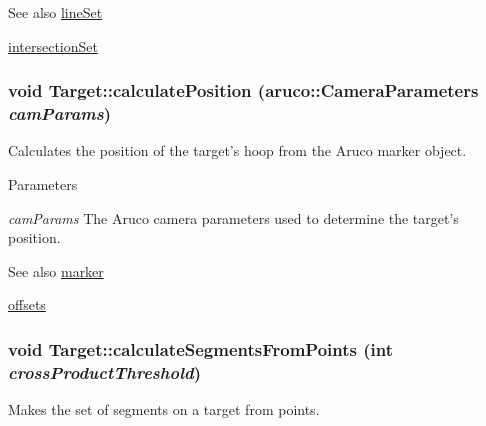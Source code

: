 \begin{DoxySeeAlso}{See also}
\hyperlink{classTarget_af112a6c4b4cb598d27f33332de574680}{lineSet} 

\hyperlink{classTarget_a26d36f01443f1f26da59e18ad4552a4f}{intersectionSet} 
\end{DoxySeeAlso}
\hypertarget{classTarget_aaeb297087804d9d7952b0588d76ac213}{
\subsubsection[{calculatePosition}]{\setlength{\rightskip}{0pt plus 5cm}void Target::calculatePosition (aruco::CameraParameters {\em camParams})}}
\label{classTarget_aaeb297087804d9d7952b0588d76ac213}


Calculates the position of the target's hoop from the Aruco marker object. 


\begin{DoxyParams}{Parameters}
\item[{\em camParams}]The Aruco camera parameters used to determine the target's position. \end{DoxyParams}
\begin{DoxySeeAlso}{See also}
\hyperlink{classTarget_a631383ffe78165e8af649470edb77986}{marker} 

\hyperlink{classTarget_af1714dc10beafcd323003e43d787f7ab}{offsets} 
\end{DoxySeeAlso}
\hypertarget{classTarget_a097b47c75568969a979ef67247b6f919}{
\subsubsection[{calculateSegmentsFromPoints}]{\setlength{\rightskip}{0pt plus 5cm}void Target::calculateSegmentsFromPoints (int {\em crossProductThreshold})}}
\label{classTarget_a097b47c75568969a979ef67247b6f919}


Makes the set of segments on a target from points. 



